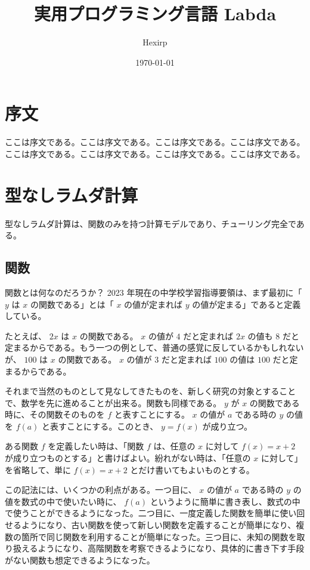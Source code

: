 \documentclass[book]{jlreq}
\title{実用プログラミング言語 Labda}
\author{Hexirp}
\date{\today}
\newcommand{\p}[1]{ \mathord{ \left( #1 \right) } }
\begin{document}
\maketitle

\chapter*{序文}

ここは序文である。ここは序文である。ここは序文である。ここは序文である。ここは序文である。ここは序文である。ここは序文である。ここは序文である。

\chapter{型なしラムダ計算}

型なしラムダ計算は、関数のみを持つ計算モデルであり、チューリング完全である。

\section{関数}

関数とは何なのだろうか？ 2023 年現在の中学校学習指導要領は、まず最初に「 \( y \) は \( x \) の関数である」とは「 \( x \) の値が定まれば \( y \) の値が定まる」であると定義している。

たとえば、 \( 2 x \) は \( x \) の関数である。 \( x \) の値が \( 4 \) だと定まれば \( 2 x \) の値も \( 8 \) だと定まるからである。もう一つの例として、普通の感覚に反しているかもしれないが、 \( 100 \) は \( x \) の関数である。 \( x \) の値が \( 3 \) だと定まれば \( 100 \) の値は \( 100 \) だと定まるからである。

それまで当然のものとして見なしてきたものを、新しく研究の対象とすることで、数学を先に進めることが出来る。関数も同様である。 \( y \) が \( x \) の関数である時に、その関数そのものを \( f \) と表すことにする。 \( x \) の値が \( a \) である時の \( y \) の値を \( f \p{ a } \) と表すことにする。このとき、 \( y = f \p{ x } \) が成り立つ。

ある関数 \( f \) を定義したい時は、「関数 \( f \) は、任意の \( x \) に対して \( f \p{ x } = x + 2 \) が成り立つものとする」と書けばよい。紛れがない時は、「任意の \( x \) に対して」を省略して、単に \( f \p{ x } = x + 2 \) とだけ書いてもよいものとする。

この記法には、いくつかの利点がある。一つ目に、 \( x \) の値が \( a \) である時の \( y \) の値を数式の中で使いたい時に、 \( f \p{ a } \) というように簡単に書き表し、数式の中で使うことができるようになった。二つ目に、一度定義した関数を簡単に使い回せるようになり、古い関数を使って新しい関数を定義することが簡単になり、複数の箇所で同じ関数を利用することが簡単になった。三つ目に、未知の関数を取り扱えるようになり、高階関数を考察できるようになり、具体的に書き下す手段がない関数も想定できるようになった。
\end{document}
